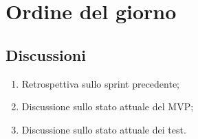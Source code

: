 \section{Ordine del giorno} \label{sec:agenda}
\subsection{Discussioni} \label{subsec:discussione}
\begin{enumerate}
    \item Retrospettiva sullo sprint precedente;
    \item Discussione sullo stato attuale del MVP;
    \item Discussione sullo stato attuale dei test.
\end{enumerate}
